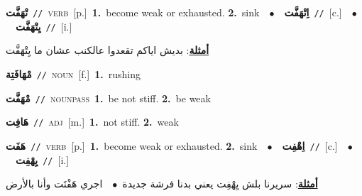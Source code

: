 \documentclass[10pt,a4paper,twoside]{article} %
\begin{document}
\begin{multicols}{2}
{\setlength\topsep{0pt}\textbf{\foreignlanguage{arabic}{تْهَفَّت}}\ {\color{gray}\texttt{//}\color{black}}\ \textsc{verb}\ [p.]\ \textbf{1.}~become weak or exhausted.  \textbf{2.}~sink\ \ $\bullet$\ \ \setlength\topsep{0pt}\textbf{\foreignlanguage{arabic}{اِتْهَفَّت}}\ {\color{gray}\texttt{//}\color{black}}\ [c.]\ \ $\bullet$\ \ \setlength\topsep{0pt}\textbf{\foreignlanguage{arabic}{يِتْهَفَّت}}\ {\color{gray}\texttt{//}\color{black}}\ [i.]\  \begin{flushright}\color{gray}\foreignlanguage{arabic}{\textbf{\underline{\foreignlanguage{arabic}{أمثلة}}}: بديش اياكم تقعدوا عالكنب عشان ما يِتْهَفَّت}\end{flushright}\color{black}} \vspace{2mm}

{\setlength\topsep{0pt}\textbf{\foreignlanguage{arabic}{مْهَافَتِة}}\ {\color{gray}\texttt{//}\color{black}}\ \textsc{noun}\ [f.]\ \textbf{1.}~rushing\ } \vspace{2mm}

{\setlength\topsep{0pt}\textbf{\foreignlanguage{arabic}{مْهَفَّت}}\ {\color{gray}\texttt{//}\color{black}}\ \textsc{noun\textunderscore pass}\ \textbf{1.}~be not stiff.  \textbf{2.}~be weak\ } \vspace{2mm}

{\setlength\topsep{0pt}\textbf{\foreignlanguage{arabic}{هَافِت}}\ {\color{gray}\texttt{//}\color{black}}\ \textsc{adj}\ [m.]\ \textbf{1.}~not stiff.  \textbf{2.}~weak\ } \vspace{2mm}

{\setlength\topsep{0pt}\textbf{\foreignlanguage{arabic}{هَفَت}}\ {\color{gray}\texttt{//}\color{black}}\ \textsc{verb}\ [p.]\ \textbf{1.}~become weak or exhausted.  \textbf{2.}~sink\ \ $\bullet$\ \ \setlength\topsep{0pt}\textbf{\foreignlanguage{arabic}{اِهْفِت}}\ {\color{gray}\texttt{//}\color{black}}\ [c.]\ \ $\bullet$\ \ \setlength\topsep{0pt}\textbf{\foreignlanguage{arabic}{يِهْفِت}}\ {\color{gray}\texttt{//}\color{black}}\ [i.]\  \begin{flushright}\color{gray}\foreignlanguage{arabic}{\textbf{\underline{\foreignlanguage{arabic}{أمثلة}}}: سريرنا بلش يِهْفِت يعني بدنا فرشة جديدة\ $\bullet$\ \  اجري هَفْتَت وأنا بالأرض}\end{flushright}\color{black}} \vspace{2mm}


\end{multicols}
\end{document}
